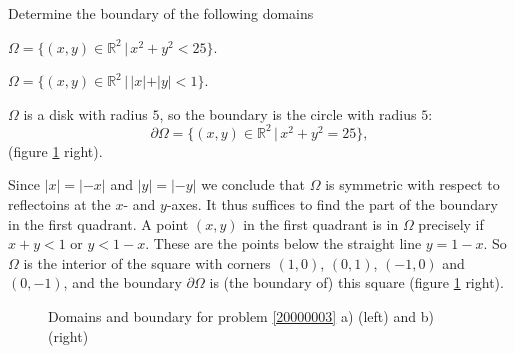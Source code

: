 Determine the boundary of the following domains
\begin{teilaufgaben}
\item
$\Omega=\{(x,y)\in\mathbb R^2\,|\, x^2+y^2<25\}$.
\item
$\Omega=\{(x,y)\in\mathbb R^2\,|\, |x|+|y|<1\}$.
\end{teilaufgaben}

\begin{loesung}
\begin{teilaufgaben}
\item
$\Omega$ is a disk with radius $5$, so the boundary is
the circle with radius $5$:
\[
\partial\Omega=\{(x,y)\in\mathbb R^2\,|\, x^2+y^2=25\},
\]
(figure \ref{20000003:fig} right).
\item
Since $|x|=|-x|$ and $|y|=|-y|$ we conclude that $\Omega$ is symmetric
with respect to reflectoins at the $x$- and $y$-axes.
It thus suffices to find the part of the boundary in the first quadrant.
A point $(x,y)$ in the first quadrant is in $\Omega$ precisely
if $x+y<1$ or $y<1-x$.
These are the points below the straight line $y=1-x$.
So $\Omega$ is the interior of the square with corners
$(1,0)$, $(0,1)$, $(-1,0)$ and $(0,-1)$,
and the boundary $\partial\Omega$ is (the boundary of) this square
(figure \ref{20000003:fig} right).
\qedhere
\end{teilaufgaben}
\begin{figure}
\begin{center}
\qquad
{}
\end{center}
\caption{Domains and boundary for problem \ref{20000003} a) (left)
and b) (right)\label{20000003:fig}}
\end{figure}
\end{loesung}
